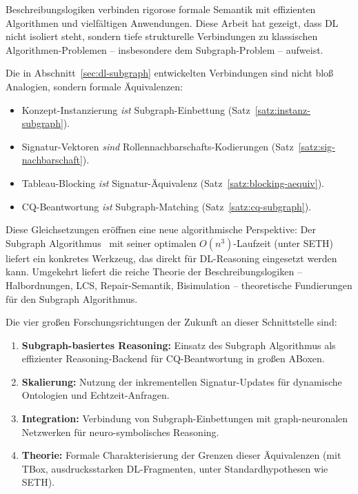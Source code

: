 ﻿\documentclass[a4paper,12pt]{article}
\theoremstyle{definition}
\theoremstyle{plain}
\theoremstyle{remark}
\begin{document}
Beschreibungslogiken verbinden rigorose formale Semantik mit
effizienten Algorithmen und vielf{\"a}ltigen Anwendungen.
Diese Arbeit hat gezeigt, dass DL nicht isoliert steht,
sondern tiefe strukturelle Verbindungen zu klassischen
Algorithmen-Problemen -- insbesondere dem Subgraph-Problem --
aufweist.

Die in Abschnitt~\ref{sec:dl-subgraph} entwickelten Verbindungen
sind nicht blo{\ss} Analogien, sondern formale {\"A}quivalenzen:
\begin{itemize}
  \item Konzept-Instanzierung \emph{ist} Subgraph-Einbettung
        (Satz~\ref{satz:instanz-subgraph}).
  \item Signatur-Vektoren \emph{sind} Rollennachbarschafts-Kodierungen
        (Satz~\ref{satz:sig-nachbarschaft}).
  \item Tableau-Blocking \emph{ist} Signatur-{\"A}quivalenz
        (Satz~\ref{satz:blocking-aequiv}).
  \item CQ-Beantwortung \emph{ist} Subgraph-Matching
        (Satz~\ref{satz:cq-subgraph}).
\end{itemize}

Diese Gleichsetzungen er{\"o}ffnen eine neue algorithmische Perspektive:
Der Subgraph Algorithmus~\cite{Epp2026} mit seiner optimalen
$O(n^3)$-Laufzeit (unter SETH) liefert ein konkretes Werkzeug,
das direkt f{\"u}r DL-Reasoning eingesetzt werden kann.
Umgekehrt liefert die reiche Theorie der Beschreibungslogiken --
Halbordnungen, LCS, Repair-Semantik, Bisimulation --
theoretische Fundierungen f{\"u}r den Subgraph Algorithmus.

Die vier gro{\ss}en Forschungsrichtungen der Zukunft
an dieser Schnittstelle sind:
\begin{enumerate}
  \item \textbf{Subgraph-basiertes Reasoning:}
        Einsatz des Subgraph Algorithmus als effizienter
        Reasoning-Backend f{\"u}r CQ-Beantwortung in gro{\ss}en ABoxen.
  \item \textbf{Skalierung:}
        Nutzung der inkrementellen Signatur-Updates f{\"u}r
        dynamische Ontologien und Echtzeit-Anfragen.
  \item \textbf{Integration:}
        Verbindung von Subgraph-Einbettungen mit graph-neuronalen
        Netzwerken f{\"u}r neuro-symbolisches Reasoning.
  \item \textbf{Theorie:}
        Formale Charakterisierung der Grenzen dieser
        {\"A}quivalenzen (mit TBox, ausdrucksstarken DL-Fragmenten,
        unter Standardhypothesen wie SETH).
\end{enumerate}
\end{document}
